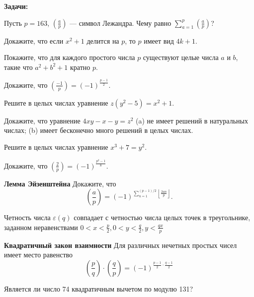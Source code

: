 \documentclass{article}
\begin{document}
    \textbf{Задачи:}

    \begin{enumerate_boxed}

        \item Пусть $p = 163$, $\left(\frac{a}{p}\right)$ — символ Лежандра.
        Чему равно $\sum\limits_{a = 1}^p\left(\frac{a}{p}\right)$?

        \item Докажите, что если $x^2 + 1$ делится на $p$, то $p$ имеет вид $4k + 1$.

        \item Покажите, что для каждого простого числа $ p $ существуют целые числа $ a $ и $ b $, такие что $ a^2 + b^2 +1 $ кратно $ p $.

        \item Докажите, что $\left(\frac{-1}{p}\right) = (-1)^{\frac{p - 1}{2}}$.

        \item Решите в целых числах уравнение $z(y^2 - 5) = x^2 + 1$.

        \item Докажите, что уравнение $4xy - x - y = z^2$ (a) не имеет решений в натуральных числах; (b) имеет бесконечно много решений в целых числах.

        \item Решите в целых числах уравнение $x^3 + 7 = y^2$.

        \item Докажите, что $\left(\frac{2}{p}\right) = (-1)^{\frac{p^2 - 1}{8}}$.

        \item \textbf{Лемма Эйзенштейна} Докажите, что
        \[\left(\frac{a}{p}\right) = (-1)^{\sum\limits_{n=1}^{(p-1)/2}\left\lfloor\frac{2an}{p}\right\rfloor}.\]

        \item Четность числа $\varepsilon(q)$ совпадает с четностью числа целых точек в треугольнике, заданном неравенствами $0 < x<\frac{p}{2} , 0 < y < \frac{q}{2}, y < \frac{qx}{p}$

        \item \textbf{Квадратичный закон взаимности} Для различных нечетных простых чисел имеет место равенство
        \[\left(\frac{p}{q}\right) \cdot \left(\frac{q}{p}\right) = (-1)^{\frac{p-1}{2}\cdot\frac{q-1}{2}}\]

        \item Является ли число 74 квадратичным вычетом по модулю 131?


\end{enumerate_boxed}
\end{document}
